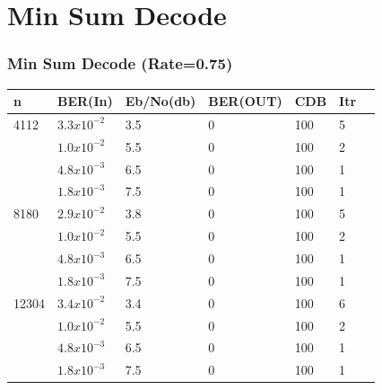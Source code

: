 \documentclass[xcolor=dvipsname]
{beamer}
\begin{document}
\section{Min Sum Decode}
\begin{frame}[t] 
\frametitle{Min Sum Decode (Rate=0.75)}
\begin{table}[]
\centering
\begin{tabular}{|l|l|l|l|l|l|l|}
\hline
n     & BER(In) 			& Eb/No(db) & BER(OUT) & CDB  & Itr \\ \hline
4112  & $3.3x10^{-2}$       & 3.5   & 0   & 100 & 5         \\  \hline
	  & $1.0x10^{-2}$       & 5.5   & 0   & 100 & 2         \\ 
      &	$4.8x10^{-3}$		& 6.5   & 0   & 100 & 1         \\
      &	$1.8x10^{-3}$		& 7.5   & 0   & 100 & 1         \\ \hline
8180  &	$2.9x10^{-2}$    	& 3.8   & 0   & 100 & 5         \\  \hline
      &	$1.0x10^{-2}$    	& 5.5   & 0   & 100 & 2         \\ 
      &	$4.8x10^{-3}$		& 6.5   & 0   & 100 & 1         \\
      &	$1.8x10^{-3}$		& 7.5   & 0   & 100 & 1         \\ \hline
12304 &	$3.4x10^{-2}$		& 3.4   & 0   & 100 & 6         \\ \hline
	  &	$1.0x10^{-2}$		& 5.5   & 0   & 100 & 2         \\  
      &	$4.8x10^{-3}$		& 6.5   & 0   & 100 & 1         \\ 
      &	$1.8x10^{-3}$		& 7.5   & 0   & 100 & 1         \\ \hline

\end{tabular}
\end{table}
\end{frame}
\end{document}
